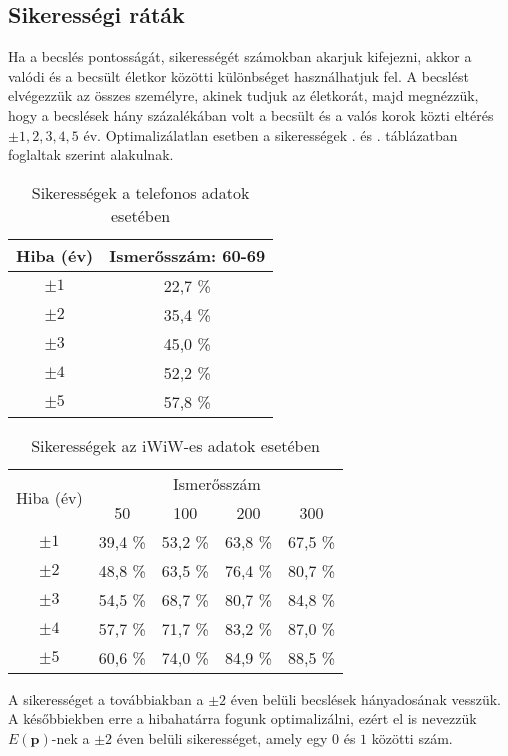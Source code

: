 \documentclass[12pt]{article}
\begin{document}
\subsection{Sikerességi ráták}
Ha a becslés pontosságát, sikerességét számokban akarjuk kifejezni, akkor a valódi és a becsült életkor közötti különbséget használhatjuk fel. A becslést elvégezzük az összes személyre, akinek tudjuk az életkorát, majd megnézzük, hogy a becslések hány százalékában volt a becsült és a valós korok közti eltérés $\pm 1, 2,3,4,5$ év. Optimalizálatlan esetben a sikerességek . és . táblázatban foglaltak szerint alakulnak.
\begin{table}[H]
	\centering
	\begin{tabular}{|c|c|}
		\hline
		Hiba (év) & Ismerősszám: 60-69 \\
		\hline
		$\pm 1$ & 22,7 \% \\
		\hline
		$\pm 2$ & 35,4 \% \\
		\hline
		$\pm 3$ & 45,0 \% \\
		\hline
		$\pm 4$ & 52,2 \% \\
		\hline
		$\pm 5$ & 57,8 \% \\
		\hline
	\end{tabular}
	\caption{Sikerességek a telefonos adatok esetében}
	\label{telefon_sikeresseg_nemopt}
\end{table}
\begin{table}[H]
	\centering
	\begin{tabular}{|c|c|c|c|c|}
		\hline
		\multirow{2}{*}{Hiba (év)} & \multicolumn{4}{|c|}{Ismerősszám} \\ \cline{2-5} & 50 & 100 & 200 & 300 \\
		\hline
		$\pm 1$ & 39,4 \% & 53,2 \% & 63,8 \% & 67,5 \% \\
		\hline
		$\pm 2$ & 48,8 \% & 63,5 \% & 76,4 \% & 80,7 \% \\
		\hline
		$\pm 3$ & 54,5 \% & 68,7 \% & 80,7 \% & 84,8 \% \\
		\hline
		$\pm 4$ & 57,7 \% & 71,7 \% & 83,2 \% & 87,0 \% \\
		\hline
		$\pm 5$ & 60,6 \% & 74,0 \% & 84,9 \% & 88,5 \% \\
		\hline
	\end{tabular}
	\caption{Sikerességek az iWiW-es adatok esetében}
	\label{iwiw_sikeresseg_nemopt} %
\end{table}
A sikerességet a továbbiakban a $\pm 2$ éven belüli becslések hányadosának vesszük. A későbbiekben erre a hibahatárra fogunk optimalizálni, ezért el is nevezzük $E(\mathbf{p})$-nek a $\pm 2$ éven belüli sikerességet, amely egy $0$ és $1$ közötti szám.
\end{document}
